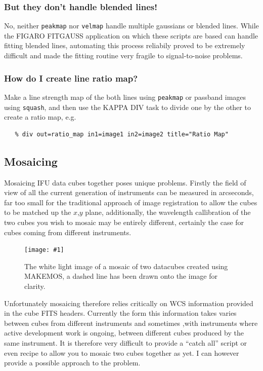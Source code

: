 \documentclass[twoside,11pt]{article}
\newcommand{\htmladdimg}[1]{}
\newcommand{\xref}[3]{#1}
\newcommand{\xlabel}[1]{}
\newcommand{\myfig} [5] {
  \begin{figure}
    \centering\texttt{[image: \#1]}
    \typeout{#1 inserted on page \arabic{page}}
    \caption{\label{#4}#5}
  \end{figure}
  }
\newcommand{\myfig}[5]{
    \label{#4} \htmladdimg{#3}\\
    Figure: #5\\
    }
\begin{document}
\subsubsection{But they don't handle blended lines!}

No, neither \xref{{\tt peakmap}}{sun237}{peakmap} nor \xref{{\tt velmap}}{sun237}{velmap} handle multiple gaussians or blended lines. While the FIGARO \xref{FITGAUSS}{sun86}{FITGAUSS} application on which these scripts are based can handle fitting blended lines, automating this process reliabily proved to be extremely difficult and made the fitting routine very fragile to signal-to-noise problems. 

\subsubsection{How do I create line ratio map?}

Make a line strength map of the both lines using \xref{{\tt peakmap}}{sun237}{peakmap} or passband images using \xref{{\tt squash}}{sun237}{squash}, and then use the KAPPA \xref{DIV}{sun95}{DIV} task to divide one by the other to create a ratio map, e.g.\

\small\begin{verbatim}
   % div out=ratio_map in1=image1 in2=image2 title="Ratio Map" 
\end{verbatim}\normalsize

\subsection{\xlabel{sc16_mos}Mosaicing\label{sc16_mos}}

Mosaicing IFU data cubes together poses unique problems. Firstly the field of view of all the current generation of instruments can be measured in arcseconds, far too small for the traditional approach of image registration to allow the cubes to be matched up the $x$,$y$ plane, additionally, the wavelength callibration of the two cubes you wish to mosaic may be entirely different, certainly the case for cubes coming from different instruments.

\myfig{sc16_mosaic.eps}{height=0.4\textheight}{sc16_mosaic.gif}{sc16_mosaic_fig}{The white light image of a mosaic of two datacubes created using MAKEMOS, a dashed line has been drawn onto the image for clarity.}

Unfortunately mosaicing therefore relies critically on WCS information provided in the cube FITS headers. Currently the form this information takes varies between cubes from different instruments and sometimes ,with instruments where active development work is ongoing, between different cubes produced by the same instrument. It is therefore very difficult to provide a ``catch all'' script or even recipe to allow you to mosaic two cubes together as yet. I can however provide a possible approach to the problem. 
\end{document}
